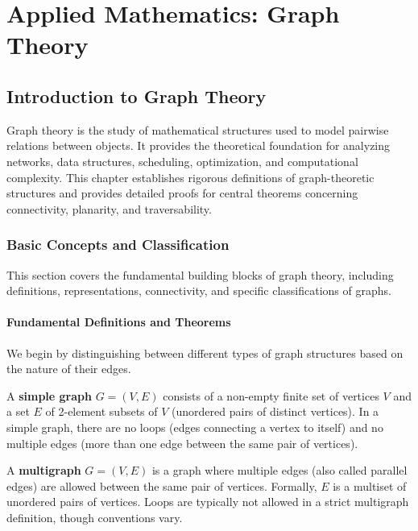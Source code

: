 \chapter{Applied Mathematics: Graph Theory}

\section{Introduction to Graph Theory}

Graph theory is the study of mathematical structures used to model pairwise relations between objects. It provides the theoretical foundation for analyzing networks, data structures, scheduling, optimization, and computational complexity. This chapter establishes rigorous definitions of graph-theoretic structures and provides detailed proofs for central theorems concerning connectivity, planarity, and traversability.

\subsection{Basic Concepts and Classification}

This section covers the fundamental building blocks of graph theory, including definitions, representations, connectivity, and specific classifications of graphs.

\subsubsection{Fundamental Definitions and Theorems}

We begin by distinguishing between different types of graph structures based on the nature of their edges.

\begin{definition}
A \textbf{simple graph} $G = (V, E)$ consists of a non-empty finite set of vertices $V$ and a set $E$ of 2-element subsets of $V$ (unordered pairs of distinct vertices). In a simple graph, there are no loops (edges connecting a vertex to itself) and no multiple edges (more than one edge between the same pair of vertices).
\end{definition}

\begin{definition}[Multigraph]
A \textbf{multigraph} $G = (V, E)$ is a graph where multiple edges (also called parallel edges) are allowed between the same pair of vertices. Formally, $E$ is a multiset of unordered pairs of vertices. Loops are typically not allowed in a strict multigraph definition, though conventions vary.
\end{definition}

